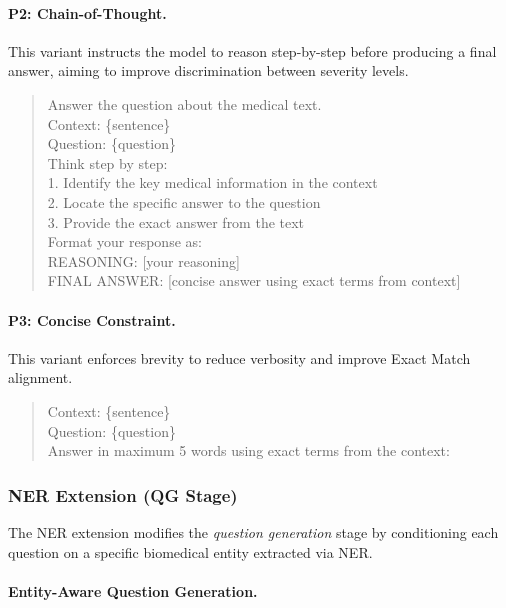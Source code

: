 \paragraph{P2: Chain-of-Thought.}
This variant instructs the model to reason step-by-step before producing a final answer, aiming to improve discrimination between severity levels.

\begin{quote}
\small\ttfamily
Answer the question about the medical text.\\[4pt]
Context: \{sentence\}\\
Question: \{question\}\\[4pt]
Think step by step:\\
1. Identify the key medical information in the context\\
2. Locate the specific answer to the question\\
3. Provide the exact answer from the text\\[4pt]
Format your response as:\\
REASONING: [your reasoning]\\
FINAL ANSWER: [concise answer using exact terms from context]
\end{quote}

\paragraph{P3: Concise Constraint.}
This variant enforces brevity to reduce verbosity and improve Exact Match alignment.

\begin{quote}
\small\ttfamily
Context: \{sentence\}\\
Question: \{question\}\\[4pt]
Answer in maximum 5 words using exact terms from the context:
\end{quote}



\subsubsection{NER Extension (QG Stage)}
\label{sec:prompts_ner}

The NER extension modifies the \textit{question generation} stage by conditioning each question on a specific biomedical entity extracted via NER.

\paragraph{Entity-Aware Question Generation.}

